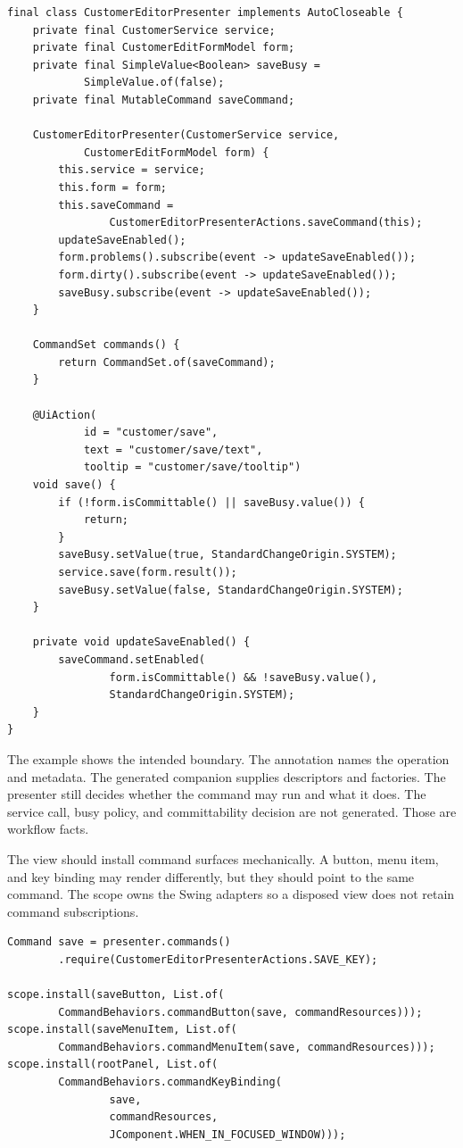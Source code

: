 \begin{lstlisting}[caption={An annotated presenter method is the command source.}]
final class CustomerEditorPresenter implements AutoCloseable {
    private final CustomerService service;
    private final CustomerEditFormModel form;
    private final SimpleValue<Boolean> saveBusy =
            SimpleValue.of(false);
    private final MutableCommand saveCommand;

    CustomerEditorPresenter(CustomerService service,
            CustomerEditFormModel form) {
        this.service = service;
        this.form = form;
        this.saveCommand =
                CustomerEditorPresenterActions.saveCommand(this);
        updateSaveEnabled();
        form.problems().subscribe(event -> updateSaveEnabled());
        form.dirty().subscribe(event -> updateSaveEnabled());
        saveBusy.subscribe(event -> updateSaveEnabled());
    }

    CommandSet commands() {
        return CommandSet.of(saveCommand);
    }

    @UiAction(
            id = "customer/save",
            text = "customer/save/text",
            tooltip = "customer/save/tooltip")
    void save() {
        if (!form.isCommittable() || saveBusy.value()) {
            return;
        }
        saveBusy.setValue(true, StandardChangeOrigin.SYSTEM);
        service.save(form.result());
        saveBusy.setValue(false, StandardChangeOrigin.SYSTEM);
    }

    private void updateSaveEnabled() {
        saveCommand.setEnabled(
                form.isCommittable() && !saveBusy.value(),
                StandardChangeOrigin.SYSTEM);
    }
}
\end{lstlisting}

The example shows the intended boundary. The annotation names the operation and metadata. The generated companion supplies descriptors and factories. The presenter still decides whether the command may run and what it does. The service call, busy policy, and committability decision are not generated. Those are workflow facts.

The view should install command surfaces mechanically. A button, menu item, and key binding may render differently, but they should point to the same command. The scope owns the Swing adapters so a disposed view does not retain command subscriptions.

\begin{lstlisting}[caption={Several Swing surfaces present one command.}]
Command save = presenter.commands()
        .require(CustomerEditorPresenterActions.SAVE_KEY);

scope.install(saveButton, List.of(
        CommandBehaviors.commandButton(save, commandResources)));
scope.install(saveMenuItem, List.of(
        CommandBehaviors.commandMenuItem(save, commandResources)));
scope.install(rootPanel, List.of(
        CommandBehaviors.commandKeyBinding(
                save,
                commandResources,
                JComponent.WHEN_IN_FOCUSED_WINDOW)));
\end{lstlisting}


